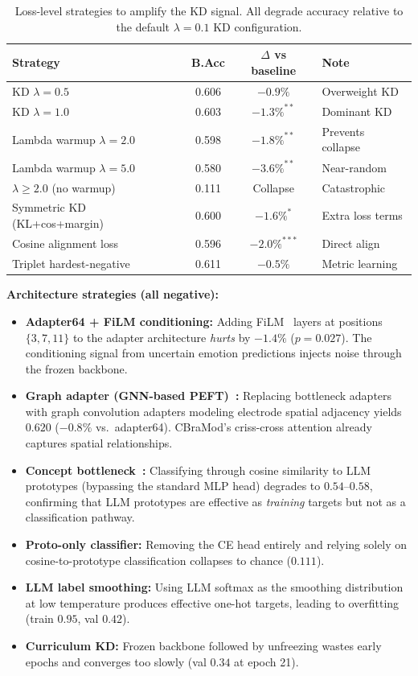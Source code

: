 \begin{table}[!h]
\caption{Loss-level strategies to amplify the KD signal. All degrade accuracy relative to the default $\lambda = 0.1$ KD configuration.}
\small
\centering
\begin{tabular}{lccl}
\toprule
Strategy & B.Acc & $\Delta$ vs baseline & Note \\
\midrule
KD $\lambda = 0.5$ & 0.606 & $-0.9\%$ & Overweight KD \\
KD $\lambda = 1.0$ & 0.603 & $-1.3\%^{**}$ & Dominant KD \\
Lambda warmup $\lambda = 2.0$ & 0.598 & $-1.8\%^{**}$ & Prevents collapse \\
Lambda warmup $\lambda = 5.0$ & 0.580 & $-3.6\%^{**}$ & Near-random \\
$\lambda \geq 2.0$ (no warmup) & 0.111 & Collapse & Catastrophic \\
Symmetric KD (KL+cos+margin) & 0.600 & $-1.6\%^{*}$ & Extra loss terms \\
Cosine alignment loss & 0.596 & $-2.0\%^{***}$ & Direct align \\
Triplet hardest-negative & 0.611 & $-0.5\%$ & Metric learning \\
\bottomrule
\end{tabular}
\label{tab:supp_loss_negative}
\end{table}

\noindent\textbf{Architecture strategies (all negative):}

\begin{itemize}
    \item \textbf{Adapter64 + FiLM conditioning:} Adding FiLM~\cite{perez2018film} layers at positions $\{3, 7, 11\}$ to the adapter architecture \emph{hurts} by $-1.4\%$ ($p = 0.027$). The conditioning signal from uncertain emotion predictions injects noise through the frozen backbone.
    \item \textbf{Graph adapter (GNN-based PEFT)~\cite{eeg_graphadapter2024}:} Replacing bottleneck adapters with graph convolution adapters modeling electrode spatial adjacency yields $0.620$ ($-0.8\%$ vs.\ adapter64). CBraMod's criss-cross attention already captures spatial relationships.
    \item \textbf{Concept bottleneck~\cite{koh2020concept}:} Classifying through cosine similarity to LLM prototypes (bypassing the standard MLP head) degrades to $0.54$--$0.58$, confirming that LLM prototypes are effective as \emph{training} targets but not as a classification pathway.
    \item \textbf{Proto-only classifier:} Removing the CE head entirely and relying solely on cosine-to-prototype classification collapses to chance ($0.111$).
    \item \textbf{LLM label smoothing:} Using LLM softmax as the smoothing distribution at low temperature produces effective one-hot targets, leading to overfitting (train $0.95$, val $0.42$).
    \item \textbf{Curriculum KD:} Frozen backbone followed by unfreezing wastes early epochs and converges too slowly (val $0.34$ at epoch 21).
\end{itemize}

